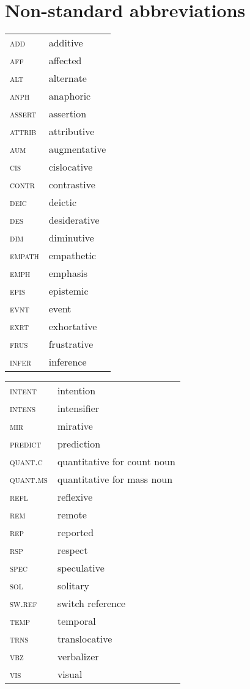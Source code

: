 \documentclass[output=paper,
modfonts,nonflat
]{langsci/langscibook}
\begin{document}
\section*{Non-standard abbreviations}

\begin{tabularx}{.45\textwidth}{lQ}
\textsc{add} & additive \\
\textsc{aff} & affected \\
\textsc{alt} & alternate \\
\textsc{anph} & anaphoric \\
\textsc{assert} & assertion \\
\textsc{attrib} & attributive \\
\textsc{aum} & augmentative \\
\textsc{cis} & cislocative \\
\textsc{contr} & contrastive \\
\textsc{deic} & deictic \\
\textsc{des} & desiderative \\
\textsc{dim} & diminutive \\
\textsc{empath} & empathetic \\
\textsc{emph} & emphasis \\
\textsc{epis} & epistemic \\
\textsc{evnt} & event \\
\textsc{exrt} & exhortative \\
\textsc{frus} & frustrative \\
\textsc{infer} & inference \\
\end{tabularx}
\begin{tabularx}{.45\textwidth}{lQ}
\textsc{intent} & intention \\
\textsc{intens} & intensifier \\
\textsc{mir} & mirative \\
\textsc{predict} & prediction \\
\textsc{quant.c} & quantitative for count noun \\
\textsc{quant.ms} & quantitative for mass noun \\
\textsc{refl} & reflexive \\
\textsc{rem} & remote \\
\textsc{rep} & reported \\
\textsc{rsp} & respect \\
\textsc{spec} & speculative \\
\textsc{sol} & solitary \\
\textsc{sw.ref} & switch reference \\
\textsc{temp} & temporal \\
\textsc{trns} & translocative \\
\textsc{vbz} & verbalizer \\
\textsc{vis} & visual \\
\end{tabularx}

\newpage 
{\sloppy
\printbibliography[heading=subbibliography,notkeyword=this]
}
\end{document}
